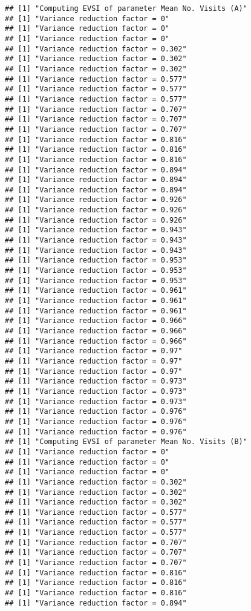 \documentclass[
]{article}
\begin{document}
\begin{verbatim}
## [1] "Computing EVSI of parameter Mean No. Visits (A)"
## [1] "Variance reduction factor = 0"
## [1] "Variance reduction factor = 0"
## [1] "Variance reduction factor = 0"
## [1] "Variance reduction factor = 0.302"
## [1] "Variance reduction factor = 0.302"
## [1] "Variance reduction factor = 0.302"
## [1] "Variance reduction factor = 0.577"
## [1] "Variance reduction factor = 0.577"
## [1] "Variance reduction factor = 0.577"
## [1] "Variance reduction factor = 0.707"
## [1] "Variance reduction factor = 0.707"
## [1] "Variance reduction factor = 0.707"
## [1] "Variance reduction factor = 0.816"
## [1] "Variance reduction factor = 0.816"
## [1] "Variance reduction factor = 0.816"
## [1] "Variance reduction factor = 0.894"
## [1] "Variance reduction factor = 0.894"
## [1] "Variance reduction factor = 0.894"
## [1] "Variance reduction factor = 0.926"
## [1] "Variance reduction factor = 0.926"
## [1] "Variance reduction factor = 0.926"
## [1] "Variance reduction factor = 0.943"
## [1] "Variance reduction factor = 0.943"
## [1] "Variance reduction factor = 0.943"
## [1] "Variance reduction factor = 0.953"
## [1] "Variance reduction factor = 0.953"
## [1] "Variance reduction factor = 0.953"
## [1] "Variance reduction factor = 0.961"
## [1] "Variance reduction factor = 0.961"
## [1] "Variance reduction factor = 0.961"
## [1] "Variance reduction factor = 0.966"
## [1] "Variance reduction factor = 0.966"
## [1] "Variance reduction factor = 0.966"
## [1] "Variance reduction factor = 0.97"
## [1] "Variance reduction factor = 0.97"
## [1] "Variance reduction factor = 0.97"
## [1] "Variance reduction factor = 0.973"
## [1] "Variance reduction factor = 0.973"
## [1] "Variance reduction factor = 0.973"
## [1] "Variance reduction factor = 0.976"
## [1] "Variance reduction factor = 0.976"
## [1] "Variance reduction factor = 0.976"
## [1] "Computing EVSI of parameter Mean No. Visits (B)"
## [1] "Variance reduction factor = 0"
## [1] "Variance reduction factor = 0"
## [1] "Variance reduction factor = 0"
## [1] "Variance reduction factor = 0.302"
## [1] "Variance reduction factor = 0.302"
## [1] "Variance reduction factor = 0.302"
## [1] "Variance reduction factor = 0.577"
## [1] "Variance reduction factor = 0.577"
## [1] "Variance reduction factor = 0.577"
## [1] "Variance reduction factor = 0.707"
## [1] "Variance reduction factor = 0.707"
## [1] "Variance reduction factor = 0.707"
## [1] "Variance reduction factor = 0.816"
## [1] "Variance reduction factor = 0.816"
## [1] "Variance reduction factor = 0.816"
## [1] "Variance reduction factor = 0.894"

\end{verbatim}
\end{document}
